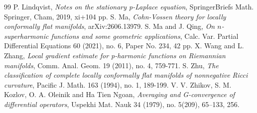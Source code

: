 \documentclass[10pt,a4paper]{amsart}
\numberwithin{equation}{section}
\begin{document}
\begin{thebibliography}{99}
 P. Lindqvist, \emph{Notes on the stationary p-Laplace equation}, SpringerBriefs Math. Springer, Cham, 2019, xi+104 pp.
 S. Ma, \emph{Cohn-Vossen theory for locally conformally flat manifolds}, arXiv:2606.13979.
 S. Ma and J. Qing, \emph{On $n$-superharmonic functions and some geometric applications}, Calc. Var. Partial Differential Equations 60 (2021), no. 6, Paper No. 234, 42 pp.
 X. Wang and L. Zhang, \emph{Local gradient estimate for p-harmonic functions on Riemannian manifolds}, Comm. Anal. Geom. 19 (2011), no. 4, 759-771.
 S. Zhu, \textit{The classification of complete locally conformally flat manifolds of nonnegative Ricci curvature}, Pacific J. Math. 163 (1994), no. 1, 189-199.
 V. V. Zhikov, S. M. Kozlov, O. A. Oleinik and Ha Tien Ngoan, \emph{Averaging and G-convergence of differential operators}, Uspekhi Mat. Nauk 34 (1979), no. 5(209), 65–133, 256.
\end{thebibliography}
\end{document}
